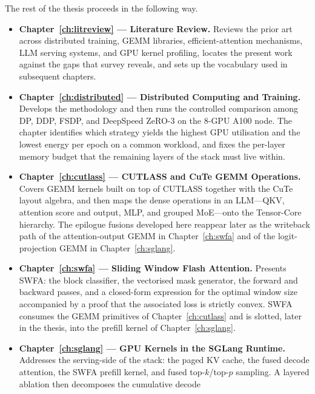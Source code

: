 \noindent The rest of the thesis proceeds in the following way.
\begin{itemize}
    \item \textbf{Chapter~\ref{ch:litreview} --- Literature Review.}
          Reviews the prior art across distributed training, GEMM
          libraries, efficient-attention mechanisms, LLM serving
          systems, and GPU kernel profiling, locates the present
          work against the gaps that survey reveals, and sets up
          the vocabulary used in subsequent chapters.
    \item \textbf{Chapter~\ref{ch:distributed} --- Distributed
          Computing and Training.} Develops the methodology and then
          runs the controlled comparison among DP, DDP, FSDP, and
          DeepSpeed ZeRO-3 on the 8-GPU A100 node. The chapter
          identifies which strategy yields the highest GPU
          utilisation and the lowest energy per epoch on a common
          workload, and fixes the per-layer memory budget that the
          remaining layers of the stack must live within.
    \item \textbf{Chapter~\ref{ch:cutlass} --- CUTLASS and CuTe GEMM
          Operations.} Covers GEMM kernels built on top of CUTLASS
          together with the CuTe layout algebra, and then maps the
          dense operations in an LLM---QKV, attention score and
          output, MLP, and grouped MoE---onto the Tensor-Core
          hierarchy. The epilogue fusions developed here reappear
          later as the writeback path of the attention-output GEMM
          in Chapter~\ref{ch:swfa} and of the logit-projection GEMM
          in Chapter~\ref{ch:sglang}.
    \item \textbf{Chapter~\ref{ch:swfa} --- Sliding Window Flash
          Attention.} Presents SWFA: the block classifier, the
          vectorised mask generator, the forward and backward
          passes, and a closed-form expression for the optimal
          window size accompanied by a proof that the associated
          loss is strictly convex. SWFA consumes the GEMM primitives
          of Chapter~\ref{ch:cutlass} and is slotted, later in the
          thesis, into the prefill kernel of
          Chapter~\ref{ch:sglang}.
    \item \textbf{Chapter~\ref{ch:sglang} --- GPU Kernels in the
          SGLang Runtime.} Addresses the serving-side of the stack:
          the paged KV cache, the fused decode attention, the SWFA
          prefill kernel, and fused top-$k$/top-$p$ sampling. A
          layered ablation then decomposes the cumulative decode

\end{itemize}
